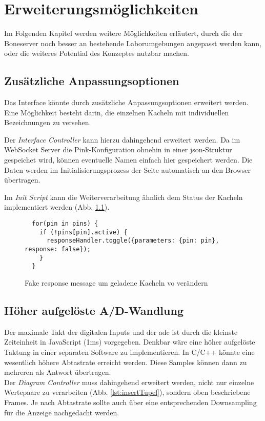 \chapter{Erweiterungsmöglichkeiten}
Im Folgenden Kapitel werden weitere Möglichkeiten erläutert, durch die der Boneserver noch besser an bestehende Laborumgebungen angepasst werden kann, oder die weiteres Potential des Konzeptes nutzbar machen.

\section{Zusätzliche Anpassungsoptionen}
Das Interface könnte durch zusätzliche Anpassungsoptionen erweitert werden. Eine Möglichkeit besteht darin, die einzelnen Kacheln mit individuellen Bezeichnungen zu versehen.

Der \textit{Interface Controller} kann hierzu dahingehend erweitert werden. Da im WebSocket Server die Pink-Konfiguration ohnehin in einer \gls{json}-Struktur gespeichet wird, können eventuelle Namen einfach hier gespeichert werden. Die Daten werden im Initialisierungsprozess der Seite automatisch an den Browser übertragen.

Im \textit{Init Script} kann die Weiterverarbeitung ähnlich dem Status der Kacheln implementiert werden (Abb. \ref{lst:fakeResponseMessage}).

\begin{figure}[H]
  \begin{lstlisting}
  for(pin in pins) {
    if (!pins[pin].active) {
      responseHandler.toggle({parameters: {pin: pin}, response: false});
    }
  }
  \end{lstlisting}
  \caption{Fake response message um geladene Kacheln vo verändern}
  \label{lst:fakeResponseMessage}
\end{figure}


\section{Höher aufgelöste A/D-Wandlung}
Der maximale Takt der digitalen Inputs und der \gls{adc} ist durch die kleinste Zeiteinheit in JavaScript (1ms) vorgegeben. Denkbar wäre eine höher aufgelöste Taktung in einer separaten Software zu implementieren. In C/C++ könnte eine wesentlich höhere Abtastrate erreicht werden. Diese Samples können dann zu mehreren als Antwort übertragen.\\

Der \textit{Diagram Controller} muss dahingehend erweitert werden, nicht nur einzelne Wertepaare zu verarbeiten (Abb. \ref{lst:insertTupel}), sondern oben beschriebene Frames. Je nach Abtastrate sollte auch über eine entsprechenden Downsampling für die Anzeige nachgedacht werden.

